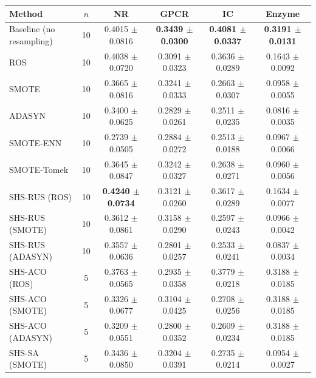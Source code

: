 \begin{tabular}{lccccc}
\toprule
Method & $n$ & NR & GPCR & IC & Enzyme \\
\midrule
Baseline (no resampling) & 10 & 0.4015 $\pm$ 0.0816 & \textbf{0.3439 $\pm$ 0.0300} & \textbf{0.4081 $\pm$ 0.0337} & \textbf{0.3191 $\pm$ 0.0131} \\
ROS & 10 & 0.4038 $\pm$ 0.0720 & 0.3091 $\pm$ 0.0323 & 0.3636 $\pm$ 0.0289 & 0.1643 $\pm$ 0.0092 \\
SMOTE & 10 & 0.3665 $\pm$ 0.0816 & 0.3241 $\pm$ 0.0333 & 0.2663 $\pm$ 0.0307 & 0.0958 $\pm$ 0.0055 \\
ADASYN & 10 & 0.3400 $\pm$ 0.0625 & 0.2829 $\pm$ 0.0261 & 0.2511 $\pm$ 0.0235 & 0.0816 $\pm$ 0.0035 \\
SMOTE-ENN & 10 & 0.2739 $\pm$ 0.0505 & 0.2884 $\pm$ 0.0272 & 0.2513 $\pm$ 0.0188 & 0.0967 $\pm$ 0.0066 \\
SMOTE-Tomek & 10 & 0.3645 $\pm$ 0.0847 & 0.3242 $\pm$ 0.0327 & 0.2638 $\pm$ 0.0271 & 0.0960 $\pm$ 0.0056 \\
SHS-RUS (ROS) & 10 & \textbf{0.4240 $\pm$ 0.0734} & 0.3121 $\pm$ 0.0260 & 0.3617 $\pm$ 0.0289 & 0.1634 $\pm$ 0.0077 \\
SHS-RUS (SMOTE) & 10 & 0.3612 $\pm$ 0.0861 & 0.3158 $\pm$ 0.0290 & 0.2597 $\pm$ 0.0243 & 0.0966 $\pm$ 0.0042 \\
SHS-RUS (ADASYN) & 10 & 0.3557 $\pm$ 0.0636 & 0.2801 $\pm$ 0.0257 & 0.2533 $\pm$ 0.0241 & 0.0837 $\pm$ 0.0034 \\
SHS-ACO (ROS) & 5 & 0.3763 $\pm$ 0.0565 & 0.2935 $\pm$ 0.0358 & 0.3779 $\pm$ 0.0218 & 0.3188 $\pm$ 0.0185 \\
SHS-ACO (SMOTE) & 5 & 0.3326 $\pm$ 0.0677 & 0.3104 $\pm$ 0.0425 & 0.2708 $\pm$ 0.0256 & 0.3188 $\pm$ 0.0185 \\
SHS-ACO (ADASYN) & 5 & 0.3209 $\pm$ 0.0551 & 0.2800 $\pm$ 0.0352 & 0.2609 $\pm$ 0.0234 & 0.3188 $\pm$ 0.0185 \\
SHS-SA (SMOTE) & 5 & 0.3436 $\pm$ 0.0850 & 0.3204 $\pm$ 0.0391 & 0.2735 $\pm$ 0.0214 & 0.0954 $\pm$ 0.0027 \\
\bottomrule
\end{tabular}

